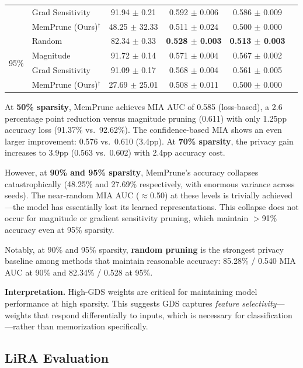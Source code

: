 \documentclass{article}
\begin{document}
\begin{table}[t]
\begin{tabular}{llcccc}
& Grad Sensitivity & 91.94 $\pm$ 0.21 & 0.592 $\pm$ 0.006 & 0.586 $\pm$ 0.009 \\
& MemPrune (Ours)$^\dagger$ & 48.25 $\pm$ 32.33 & 0.511 $\pm$ 0.024 & 0.500 $\pm$ 0.000 \\
\midrule
\multirow{4}{*}{95\%} & Random & 82.34 $\pm$ 0.33 & \textbf{0.528 $\pm$ 0.003} & \textbf{0.513 $\pm$ 0.003} \\
& Magnitude & 91.72 $\pm$ 0.14 & 0.571 $\pm$ 0.004 & 0.567 $\pm$ 0.002 \\
& Grad Sensitivity & 91.09 $\pm$ 0.17 & 0.568 $\pm$ 0.004 & 0.561 $\pm$ 0.005 \\
& MemPrune (Ours)$^\dagger$ & 27.69 $\pm$ 25.01 & 0.508 $\pm$ 0.011 & 0.500 $\pm$ 0.000 \\
\bottomrule
\end{tabular}
\end{table}

At \textbf{50\% sparsity}, MemPrune achieves MIA AUC of 0.585 (loss-based), a 2.6 percentage point reduction versus magnitude pruning (0.611) with only 1.25pp accuracy loss (91.37\% vs.\ 92.62\%). The confidence-based MIA shows an even larger improvement: 0.576 vs.\ 0.610 (3.4pp). At \textbf{70\% sparsity}, the privacy gain increases to 3.9pp (0.563 vs.\ 0.602) with 2.4pp accuracy cost.

However, at \textbf{90\% and 95\% sparsity}, MemPrune's accuracy collapses catastrophically (48.25\% and 27.69\% respectively, with enormous variance across seeds). The near-random MIA AUC ($\approx$0.50) at these levels is trivially achieved---the model has essentially lost its learned representations. This collapse does not occur for magnitude or gradient sensitivity pruning, which maintain $>$91\% accuracy even at 95\% sparsity.

Notably, at 90\% and 95\% sparsity, \textbf{random pruning} is the strongest privacy baseline among methods that maintain reasonable accuracy: 85.28\% / 0.540 MIA AUC at 90\% and 82.34\% / 0.528 at 95\%.

\textbf{Interpretation.} High-GDS weights are critical for maintaining model performance at high sparsity. This suggests GDS captures \emph{feature selectivity}---weights that respond differentially to inputs, which is necessary for classification---rather than memorization specifically.

\subsection{LiRA Evaluation}
\end{document}
